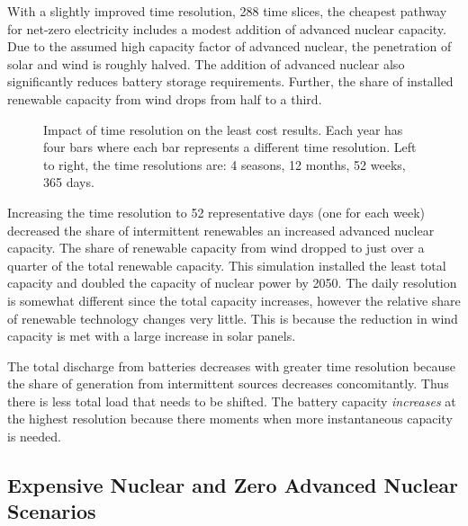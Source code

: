 With a slightly improved time resolution, 288 time slices, the cheapest pathway
for net-zero electricity includes a modest addition of advanced nuclear capacity.
Due to the assumed high capacity factor of advanced nuclear, the penetration of
solar and wind is roughly halved. The addition of advanced nuclear also significantly
reduces battery storage requirements. Further, the share of installed renewable
capacity from wind drops from half to a third.

\begin{figure}[H]
  \centering
  \resizebox{0.95\columnwidth}{!}{}
  \caption{Impact of time resolution on the least cost results. Each year has four bars where
  each bar represents a different time resolution. Left to right, the time resolutions are: 4
  seasons, 12 months, 52 weeks, 365 days.}
  \label{fig:time_res_LC}
\end{figure}

Increasing the time resolution to 52 representative days (one for
each week) decreased the share of intermittent renewables an increased advanced
nuclear capacity. The share of renewable capacity from wind dropped to
just over a quarter of the total renewable capacity. This simulation installed
the least total capacity and doubled the capacity of nuclear power by 2050.
The daily resolution is somewhat different since the total capacity increases,
however the relative share of renewable technology changes very little. This is
because the reduction in wind capacity is met with a large increase in solar
panels.

The total discharge from batteries decreases with greater time resolution because
the share of generation from intermittent sources decreases concomitantly. Thus
there is less total load that needs to be shifted. The battery capacity \textit{increases}
at the highest resolution because there moments when more instantaneous capacity is
needed.

\subsection{Expensive Nuclear and Zero Advanced Nuclear Scenarios}

